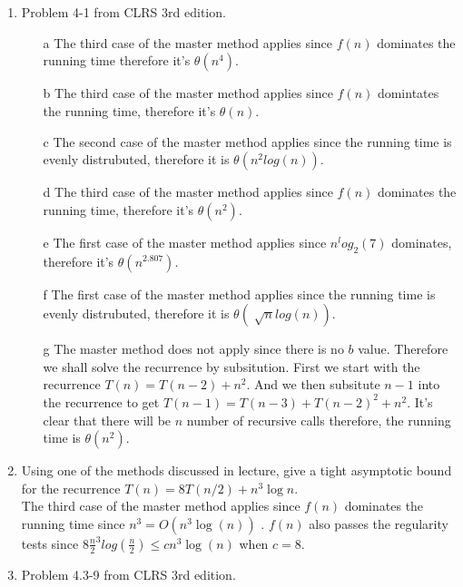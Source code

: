 \documentclass[letterpaper,11pt]{article}
\begin{document}


 \\

 \\



\begin{enumerate}
\item Problem 4-1 from CLRS 3rd edition.
\begin{enumerate}
\item[a]The third case of the master method applies since  $f(n)$ dominates the running time therefore it's $\theta(n^4)$.

\item[b] The third case of the master method applies since $f(n)$ domintates the running time, therefore it's $\theta(n)$.
\item[c] The second case of the master method applies since the running time is evenly distrubuted, therefore it is $\theta (n^2log(n))$.
\item[d] The third case of the master method applies since $f(n)$ dominates the running time, therefore it's $\theta(n^2)$.
\item[e] 
The first case of the master method applies since  $n^log_2(7)$ dominates, therefore it's $\theta(n^{2.807}) $.
\item[f] The first case of the master method applies since the running time is evenly distrubuted, therefore it is $\theta(\sqrt[]{n}log(n))$.
\item[g] The master method does not apply since there is no $b$ value. Therefore we shall solve the recurrence by subsitution. First we start with the recurrence $T(n) = T(n-2) + n^2$. And we then subsitute $n-1$ into the recurrence to get $T(n-1) = T(n-3) + T(n-2)^2 + n^2$. It's clear that there will be $n$ number of recursive calls therefore, the running time is $\theta (n^2)$.

\end{enumerate}
\item Using one of the methods discussed in lecture, give a tight asymptotic bound for the recurrence $T(n) = 8T(n/2) + n^3 \log n$. \\
The third case of the master method applies since $f(n)$ dominates the running time since $n^3 = O(n^3\log(n))$ . $f(n)$ also passes the regularity tests since $8\frac{n}{2}^3log(\frac{n}{2}) \leq cn^3\log(n)$ when $c=8$.
\item Problem 4.3-9 from CLRS 3rd edition.


\end{enumerate}
\end{document}
